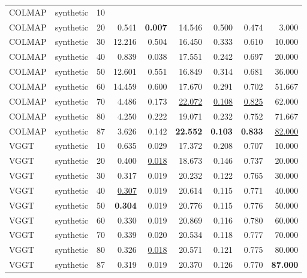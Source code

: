 \begin{table}[H]
\begin{tabular}{llrrrrrrr}
\midrule
COLMAP & synthetic & 10 &  &  &  &  &  &  \\
COLMAP & synthetic & 20 & 0.541 & \textbf{0.007} & 14.546 & 0.500 & 0.474 & 3.000 \\
COLMAP & synthetic & 30 & 12.216 & 0.504 & 16.450 & 0.333 & 0.610 & 10.000 \\
COLMAP & synthetic & 40 & 0.839 & 0.038 & 17.551 & 0.242 & 0.697 & 20.000 \\
COLMAP & synthetic & 50 & 12.601 & 0.551 & 16.849 & 0.314 & 0.681 & 36.000 \\
COLMAP & synthetic & 60 & 14.459 & 0.600 & 17.670 & 0.291 & 0.702 & 51.667 \\
COLMAP & synthetic & 70 & 4.486 & 0.173 & \underline{22.072} & \underline{0.108} & \underline{0.825} & 62.000 \\
COLMAP & synthetic & 80 & 4.250 & 0.222 & 19.071 & 0.232 & 0.752 & 71.667 \\
COLMAP & synthetic & 87 & 3.626 & 0.142 & \textbf{22.552} & \textbf{0.103} & \textbf{0.833} & \underline{82.000} \\
VGGT & synthetic & 10 & 0.635 & 0.029 & 17.372 & 0.208 & 0.707 & 10.000 \\
VGGT & synthetic & 20 & 0.400 & \underline{0.018} & 18.673 & 0.146 & 0.737 & 20.000 \\
VGGT & synthetic & 30 & 0.317 & 0.019 & 20.232 & 0.122 & 0.765 & 30.000 \\
VGGT & synthetic & 40 & \underline{0.307} & 0.019 & 20.614 & 0.115 & 0.771 & 40.000 \\
VGGT & synthetic & 50 & \textbf{0.304} & 0.019 & 20.776 & 0.115 & 0.776 & 50.000 \\
VGGT & synthetic & 60 & 0.330 & 0.019 & 20.869 & 0.116 & 0.780 & 60.000 \\
VGGT & synthetic & 70 & 0.339 & 0.020 & 20.534 & 0.118 & 0.777 & 70.000 \\
VGGT & synthetic & 80 & 0.326 & \underline{0.018} & 20.571 & 0.121 & 0.775 & 80.000 \\
VGGT & synthetic & 87 & 0.319 & 0.019 & 20.370 & 0.126 & 0.770 & \textbf{87.000} \\
\bottomrule
\end{tabular}
\end{table}